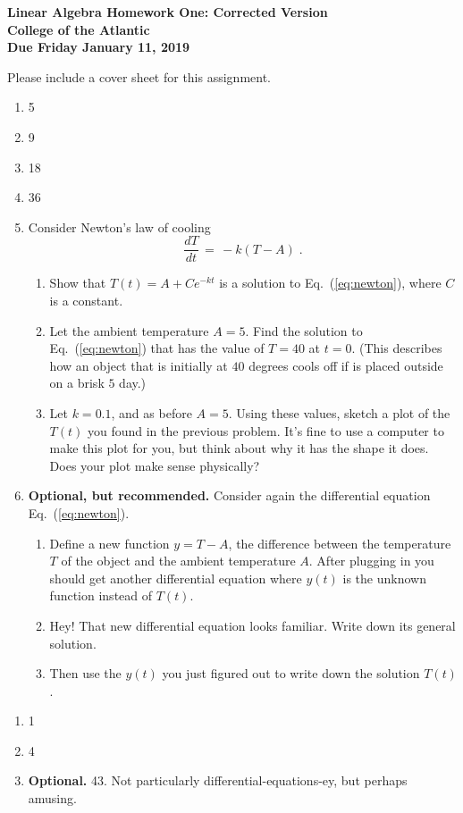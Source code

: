 \documentclass[11pt]{article}
\begin{document}
\pagestyle{empty}
 
\begin{center}
{\Large {\bf Linear Algebra Homework One: Corrected Version}}\\
\medskip
{\large {\bf College of the Atlantic}}\\
\medskip
{\large {\bf Due Friday January 11, 2019}}\\
\medskip
\end{center}



\noindent Please include a cover sheet for this assignment.\\

\begin{enumerate}
\setlength{\itemsep}{-1mm}
  \item 5
  \item 9
  \item 18
  \item 36
  \item Consider Newton's law of cooling
\begin{equation}
  \frac{dT}{dt} \, = \, -k(T-A) \;.
\label{eq:newton}
\end{equation}
\begin{enumerate}
    \item Show that $T(t) = A + C e^{-kt}$ is a solution to
      Eq.~(\ref{eq:newton}), where $C$ is a constant.
    \item Let the ambient temperature $A = 5$.  Find the solution
      to Eq.~(\ref{eq:newton}) that has the value of $T=40$ at $t=0$.
      (This describes how an object that is initially at $40$ degrees
      cools off if is placed outside on a brisk $5$ day.) 
    \item Let $k=0.1$, and as before $A=5$.  Using these values,
      sketch a plot of the $T(t)$ you found in the previous problem.
      It's fine to use a computer to make this plot for you, but think
      about why it has the shape it does.  Does your plot make sense
      physically? 
\end{enumerate}
  \item {\bf Optional, but recommended.}  Consider again the
    differential equation Eq.~(\ref{eq:newton}).  
\begin{enumerate}  
  \item Define a new
    function $y = T-A$, the difference between the temperature $T$ of
    the object and the ambient temperature $A$.  After plugging in you
    should get another differential equation where $y(t)$ is the
    unknown function instead of $T(t)$.
  \item Hey!  That new differential equation looks familiar.  Write
    down its general solution.
  \item Then use the $y(t)$ you just figured out to write down the
    solution $T(t)$.\\
\end{enumerate}

\end{enumerate}

\begin{enumerate}
\setlength{\itemsep}{-1mm}
  \item 1
  \item 4
  \item {\bf Optional.} 43.  Not particularly
    differential-equations-ey, but perhaps amusing.
\end{enumerate}
\end{document}
